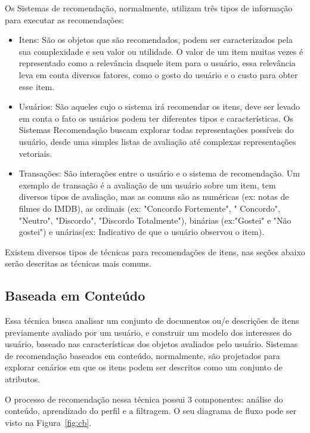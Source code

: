 Os  Sistemas de recomendação, normalmente, utilizam três tipos de informação para executar as recomendações\cite{ricci2011introduction}:
\begin{itemize}
    \item Itens: São os objetos que são recomendados, podem ser caracterizados pela sua complexidade e seu valor ou utilidade. O valor de um item muitas vezes é representado como a relevância daquele item para o usuário, essa relevância leva em conta diversos fatores, como o gosto do usuário e o custo para obter esse item.
    \item Usuários: São aqueles cujo o sistema irá recomendar os itens, deve ser levado em conta o fato os usuários podem ter diferentes tipos e características. Os Sistemas Recomendação buscam explorar todas representações possíveis do usuário, desde uma simples listas de avaliação até complexas representações vetoriais.
    \item Transações: São interações entre o usuário e o sistema de recomendação. Um exemplo de transação é a avaliação de um usuário sobre um item, tem diversos tipos de avaliação, mas as comuns são as numéricas (ex: notas de filmes do IMDB), as ordinais (ex: "Concordo Fortemente", " Concordo", "Neutro", "Discordo", "Discordo Totalmente"), binárias (ex:"Gostei" e "Não gostei") e unárias(ex: Indicativo de que o usuário observou o item).
\end{itemize}
Existem diversos tipos de técnicas para recomendações de itens, nas seções abaixo serão descritas as técnicas mais comuns.
\subsection{Baseada em Conteúdo}
Essa técnica busca analisar um conjunto de documentos ou/e descrições de itens previamente avaliado por um usuário, e construir um modelo dos interesses do usuário, baseado nas características dos objetos avaliados pelo usuário\cite{lops2011content}. Sistemas de recomendação baseados em conteúdo, normalmente, são projetados para explorar cenários em que os itens podem ser descritos como um conjunto de atributos\cite{aggarwal2016recommender}.

O processo de recomendação nessa técnica possui 3 componentes: análise do conteúdo,  aprendizado do perfil e a filtragem\cite{lops2011content}. O seu diagrama de fluxo pode ser visto na Figura~\ref{fig:cb}.

